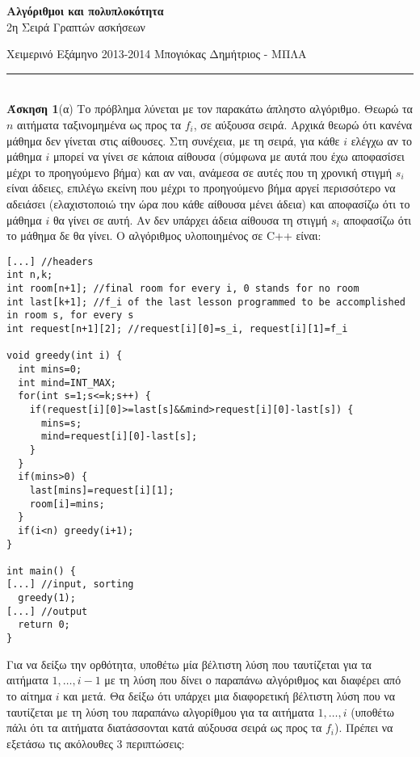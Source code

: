 \documentclass[12pt]{article}
\newcommand\en[1]{\latintext #1\greektext}
\newcommand{\HRule}{\rule{\linewidth}{0.1mm}}
\begin{document}
\begin{center}
{\bf Αλγόριθμοι και πολυπλοκότητα}\\
2η Σειρά Γραπτών ασκήσεων
\end{center}
Χειμερινό Εξάμηνο 2013-2014 \hfill Μπογιόκας Δημήτριος - ΜΠΛΑ
\HRule\\
{\bf Άσκηση 1}(α) Το πρόβλημα λύνεται με τον παρακάτω άπληστο αλγόριθμο. Θεωρώ τα $n$ αιτήματα ταξινομημένα ως προς τα $f_i$, σε αύξουσα σειρά. Αρχικά θεωρώ ότι κανένα μάθημα δεν γίνεται στις αίθουσες. Στη συνέχεια, με τη σειρά, για κάθε $i$ ελέγχω αν το μάθημα $i$ μπορεί να γίνει σε κάποια αίθουσα (σύμφωνα με αυτά που έχω αποφασίσει μέχρι το προηγούμενο βήμα) και αν ναι, ανάμεσα σε αυτές που τη χρονική στιγμή $s_i$ είναι άδειες, επιλέγω εκείνη που μέχρι το προηγούμενο βήμα αργεί περισσότερο να αδειάσει (ελαχιστοποιώ την ώρα που κάθε αίθουσα μένει άδεια) και αποφασίζω ότι το μάθημα $i$ θα γίνει σε αυτή. Αν δεν υπάρχει άδεια αίθουσα τη στιγμή $s_i$ αποφασίζω ότι το μάθημα δε θα γίνει. Ο αλγόριθμος υλοποιημένος σε \en{C++} είναι:
\latintext\begin{lstlisting}
[...] //headers
int n,k;
int room[n+1]; //final room for every i, 0 stands for no room
int last[k+1]; //f_i of the last lesson programmed to be accomplished in room s, for every s
int request[n+1][2]; //request[i][0]=s_i, request[i][1]=f_i

void greedy(int i) {
  int mins=0;
  int mind=INT_MAX;
  for(int s=1;s<=k;s++) {
    if(request[i][0]>=last[s]&&mind>request[i][0]-last[s]) {
      mins=s;
      mind=request[i][0]-last[s];
    }
  }
  if(mins>0) {
    last[mins]=request[i][1];
    room[i]=mins;
  }
  if(i<n) greedy(i+1);
}

int main() {
[...] //input, sorting
  greedy(1);
[...] //output
  return 0;
}
\end{lstlisting}\greektext
Για να δείξω την ορθότητα, υποθέτω μία βέλτιστη λύση που ταυτίζεται για τα αιτήματα $1,\ldots,i-1$ με τη λύση που δίνει ο παραπάνω αλγόριθμος και διαφέρει από το αίτημα $i$ και μετά. Θα δείξω ότι υπάρχει μια διαφορετική βέλτιστη λύση που να ταυτίζεται με τη λύση του παραπάνω αλγορίθμου για τα αιτήματα $1,\ldots,i$ (υποθέτω πάλι ότι τα αιτήματα διατάσσονται κατά αύξουσα σειρά ως προς τα $f_i$). Πρέπει να εξετάσω τις ακόλουθες 3 περιπτώσεις:
\end{document}
